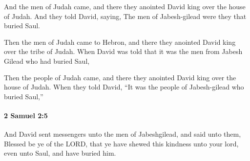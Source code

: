 			\begin{versebox}
					\item[BHS] 
					\item[ASV] And the men of Judah came, and there they anointed David king over the house of Judah. And they told David, saying, The men of Jabesh-gilead were they that buried Saul.
					\item[NIV] Then the men of Judah came to Hebron, and there they anointed David king over the tribe of Judah. When David was told that it was the men from Jabesh Gilead who had buried Saul,
					\item[NRSV] Then the people of Judah came, and there they anointed David king over the house of Judah. When they told David, “It was the people of Jabesh-gilead who buried Saul,”
			\end{versebox}

		\paragraph{2 Samuel 2:5} %
			\label{2SAMUEL-2-5}

			And David sent messengers unto the men of Jabeshgilead, and said unto them, Blessed be ye of the LORD, that ye have shewed this kindness unto your lord, even unto Saul, and have buried him.

